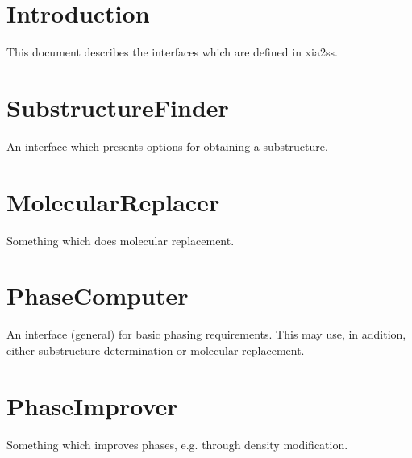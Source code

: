 \documentclass[a4paper, 11pt]{article}
\begin{document}
\section{Introduction}

This document describes the interfaces which are defined in xia2ss.

\section{SubstructureFinder}

An interface which presents options for obtaining a substructure.

\section{MolecularReplacer}

Something which does molecular replacement.

\section{PhaseComputer}

An interface (general) for basic phasing requirements. This may use, in 
addition, either substructure determination or molecular replacement.

\section{PhaseImprover}

Something which improves phases, e.g. through density modification.
\end{document}
